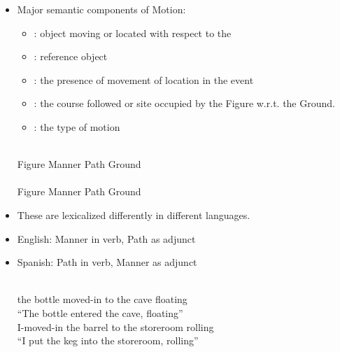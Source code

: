 \documentclass[headrule,footrule]{foils}
\begin{document}
\begin{itemize}
\item Major semantic components of Motion:
\begin{itemize}
\item {}: object moving or located with respect to the  
\item {}: reference object
\item {}: the presence of movement of location in the event
\item {}: the course followed or site occupied by the Figure w.r.t. the Ground.
\item {}: the type of motion
\end{itemize}
\begin{exe}
  \ex \gll {}    \\
  Figure Manner Path Ground \\
  \ex \gll {}    \\
  Figure Manner Path Ground \\
\end{exe}

\item These are lexicalized differently in different languages.
\end{itemize}
\MyLogo{}
\begin{itemize}
\item English: Manner in verb, Path as adjunct
  \begin{exe}
    \ex {}
    \ex {}
  \end{exe}
\item Spanish: Path in verb, Manner  as adjunct
  \begin{exe}
    \ex \gll {}       \\
    the bottle moved-in to the cave floating \\
    \trans ``The bottle entered the cave, floating''
    \ex \gll {}    
       \\
    I-moved-in the barrel to the storeroom rolling \\
    \trans ``I put the keg into the storeroom, rolling''
  \end{exe}
\end{itemize}
\end{document}
